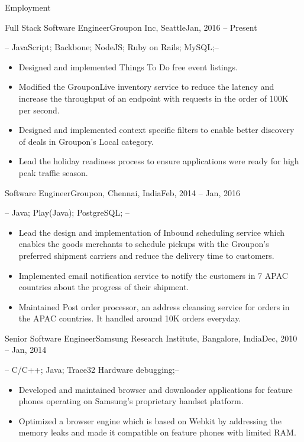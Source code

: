 \documentclass[]{mcdowellcv}
\begin{document}
	\makeheader
	\begin{cvsection}{Employment}
		\begin{cvsubsection}{Full Stack Software Engineer}{Groupon Inc, Seattle}{Jan, 2016 -- Present}
			\item {} -- JavaScript; Backbone; NodeJS; Ruby on Rails;  MySQL;--
			\begin{itemize}
			 	\item Designed and implemented Things To Do free event listings.
				\item Modified the GrouponLive inventory service to reduce the latency and increase the throughput of an endpoint with requests in the order of 100K per second.
				\item Designed and implemented context specific filters to enable better discovery of deals in Groupon's Local category.
				\item Lead the holiday readiness process to ensure applications were ready for high peak traffic season.
			\end{itemize}
		\end{cvsubsection}

		\begin{cvsubsection}{Software Engineer}{Groupon, Chennai, India}{Feb, 2014 -- Jan, 2016}
			\item {} -- Java; Play(Java); PostgreSQL; --
			\begin{itemize}
				\item  Lead the design and implementation of Inbound scheduling service which enables the goods merchants to schedule pickups with the Groupon's preferred shipment carriers and reduce the delivery time to customers.
				\item Implemented email notification service to notify the customers in 7 APAC countries about the progress of their shipment.
				\item Maintained Post order processor, an address cleansing service for orders in the APAC countries. It handled around 10K orders everyday.
			\end{itemize}
		\end{cvsubsection}

		\begin{cvsubsection}{Senior Software Engineer}{Samsung Research Institute, Bangalore, India}{Dec, 2010 -- Jan, 2014}

			\item  {} -- C/C++; Java; Trace32 Hardware debugging;--
			\begin{itemize}
				\item Developed and maintained browser and downloader applications for feature phones operating on Samsung's proprietary handset platform.
				\item Optimized a browser engine which is based on Webkit by addressing the memory leaks and made it compatible on feature phones with limited RAM.
			\end{itemize}
		\end{cvsubsection}
	\end{cvsection}
\end{document}
